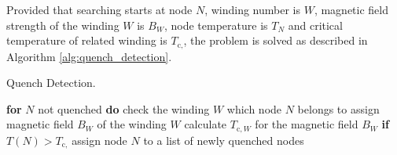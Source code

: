 Provided that searching starts at node $N$, winding number is $W$, magnetic field strength of the winding $W$ is $B_W$, node temperature is $T_N$ and critical temperature of related winding is $T_{\text{c},}$, the problem is solved as described in Algorithm \ref{alg:quench_detection}.

\begin{algorithm}[H]
    \caption{Quench Detection.}
    \label{alg:quench_detection}
    \begin{algorithmic}[1]
    \STATE \textbf{for} $N$ not quenched \textbf{do}
    \STATE \hspace{0.5cm} check the winding $W$ which node $N$ belongs to
    \STATE \hspace{0.5cm} assign magnetic field $B_W$ of the winding $W$
    \STATE \hspace{0.5cm} calculate $T_{\text{c},W}$ for the magnetic field $B_W$
    \STATE \hspace{0.5cm} \textbf{if} $T(N) > T_{\text{c},}$
    \STATE \hspace{1.0cm} assign node $N$ to a list of newly quenched nodes
    \end{algorithmic}
\end{algorithm}